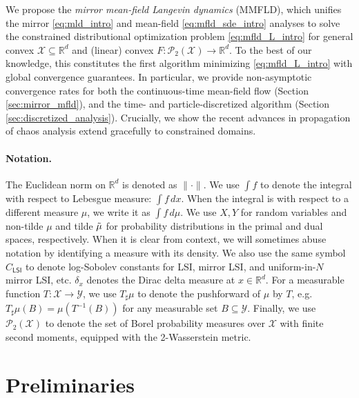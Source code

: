 \documentclass{article}
\newcommand{\CLSI}[0]{C_{\mathsf{LSI}}}
\begin{document}
We propose the \emph{mirror mean-field Langevin dynamics} (MMFLD), which unifies the mirror \eqref{eq:mld_intro} and mean-field \eqref{eq:mfld_sde_intro} analyses to solve the constrained distributional optimization problem \eqref{eq:mfld_L_intro} for general convex $\mathcal{X}\subseteq \mathbb{R}^d$ and (linear) convex $F:\mathcal{P}_2(\mathcal{X})\to\mathbb{R}^d$. To the best of our knowledge, this constitutes the first algorithm minimizing \eqref{eq:mfld_L_intro} with global convergence guarantees. In particular, we provide non-asymptotic convergence rates for both the continuous-time mean-field flow (Section \ref{sec:mirror_mfld}), and the time- and particle-discretized algorithm (Section \ref{sec:discretized_analysis}). Crucially, we show the recent advances in propagation of chaos analysis extend gracefully to constrained domains.


\paragraph{Notation.} The Euclidean norm on $\mathbb{R}^d$ is denoted as $\|\cdot\|$. We use $\int f$ to denote the integral with respect to Lebesgue measure: $\int f\,dx$. When the integral is with respect to a different measure $\mu$, we write it as $\int f\, d\mu$. We use $X, Y$ for random variables and non-tilde $\mu$ and tilde $\Tilde\mu$ for probability distributions in the primal and dual spaces, respectively. When it is clear from context, we will sometimes abuse notation by identifying a measure with its density. We also use the same symbol $\CLSI$ to denote log-Sobolev constants for LSI, mirror LSI, and uniform-in-$N$ mirror LSI, etc. $\delta_x$ denotes the Dirac delta measure at $x\in\mathbb{R}^d$. For a measurable function $T:\mathcal{X}\to\mathcal{Y}$, we use $T_\sharp \mu$ to denote the pushforward of $\mu$ by $T$, e.g. $T_\sharp\mu(B) = \mu(T^{-1}(B))$ for any measurable set $B\subseteq \mathcal{Y}$. Finally, we use $\mathcal{P}_2(\mathcal{X})$ to denote the set of Borel probability measures over $\mathcal{X}$ with finite second moments, equipped with the 2-Wasserstein metric.


\section{Preliminaries}\label{sec:prelim}
\end{document}
